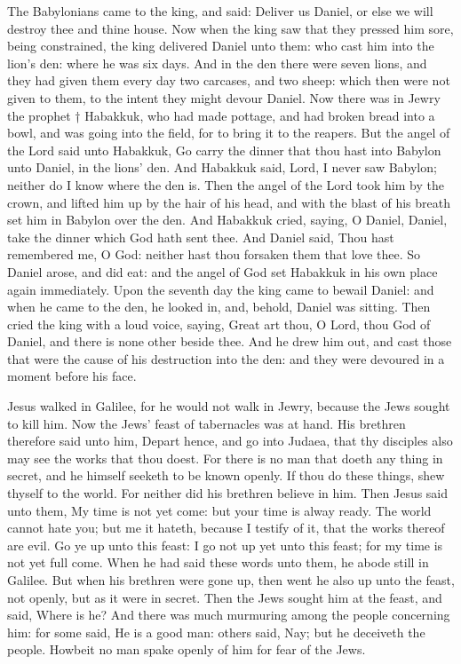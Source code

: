  The Babylonians came to the king, and said: Deliver us Daniel, or else we will destroy thee and thine house. Now when the king saw that they pressed him sore, being constrained, the king delivered Daniel unto them: who cast him into the lion’s den: where he was six days. And in the den there were seven lions, and they had given them every day two carcases, and two sheep: which then were not given to them, to the intent they might devour Daniel. Now there was in Jewry the prophet † Habakkuk, who had made pottage, and had broken bread into a bowl, and was going into the field, for to bring it to the reapers. But the angel of the Lord said unto Habakkuk, Go carry the dinner that thou hast into Babylon unto Daniel, in the lions’ den. And Habakkuk said, Lord, I never saw Babylon; neither do I know where the den is. Then the angel of the Lord took him by the crown, and lifted him up by the hair of his head, and with the blast of his breath set him in Babylon over the den. And Habakkuk cried, saying, O Daniel, Daniel, take the dinner which God hath sent thee. And Daniel said, Thou hast remembered me, O God: neither hast thou forsaken them that love thee. So Daniel arose, and did eat: and the angel of God set Habakkuk in his own place again immediately. Upon the seventh day the king came to bewail Daniel: and when he came to the den, he looked in, and, behold, Daniel was sitting. Then cried the king with a loud voice, saying, Great art thou, O Lord, thou God of Daniel, and there is none other beside thee. And he drew him out, and cast those that were the cause of his destruction into the den: and they were devoured in a moment before his face. 


 Jesus walked in Galilee, for he would not walk in Jewry, because the Jews sought to kill him. Now the Jews' feast of tabernacles was at hand. His brethren therefore said unto him, Depart hence, and go into Judaea, that thy disciples also may see the works that thou doest. For there is no man that doeth any thing in secret, and he himself seeketh to be known openly. If thou do these things, shew thyself to the world. For neither did his brethren believe in him. Then Jesus said unto them, My time is not yet come: but your time is alway ready. The world cannot hate you; but me it hateth, because I testify of it, that the works thereof are evil. Go ye up unto this feast: I go not up yet unto this feast; for my time is not yet full come. When he had said these words unto them, he abode still in Galilee. But when his brethren were gone up, then went he also up unto the feast, not openly, but as it were in secret. Then the Jews sought him at the feast, and said, Where is he? And there was much murmuring among the people concerning him: for some said, He is a good man: others said, Nay; but he deceiveth the people. Howbeit no man spake openly of him for fear of the Jews.

